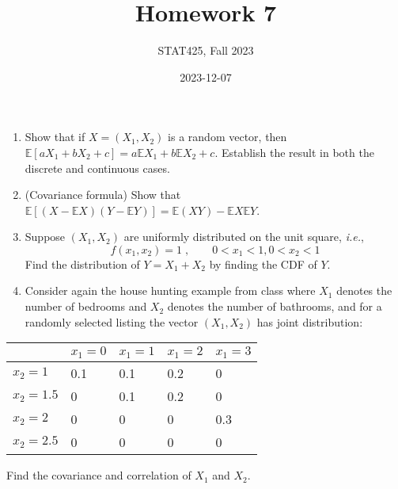 \documentclass[
  letterpaper,
  DIV=11,
  numbers=noendperiod]{scrartcl}
\title{Homework 7}
\author{STAT425, Fall 2023}
\date{2023-12-07}
\begin{document}
\maketitle
\pagestyle{fancy}  

\ifdefined\Shaded\renewenvironment{Shaded}{\begin{tcolorbox}[borderline west={3pt}{0pt}{shadecolor}, interior hidden, sharp corners, enhanced, boxrule=0pt, breakable, frame hidden]}{\end{tcolorbox}}\fi

\begin{enumerate}
\def\labelenumi{\arabic{enumi}.}
\item
  Show that if \(X = (X_1, X_2)\) is a random vector, then
  \(\mathbb{E}\left[aX_1 + bX_2 + c\right] = a\mathbb{E}X_1 + b\mathbb{E}X_2 + c\).
  Establish the result in both the discrete and continuous cases.
\item
  (Covariance formula) Show that
  \(\mathbb{E}\left[(X - \mathbb{E}X)(Y - \mathbb{E}Y)\right] = \mathbb{E}(XY) - \mathbb{E}X\mathbb{E}Y\).
\item
  Suppose \((X_1, X_2)\) are uniformly distributed on the unit square,
  \emph{i.e.}, \[f(x_1, x_2) = 1\;,\qquad 0 < x_1 < 1, 0 < x_2 < 1\]
  Find the distribution of \(Y = X_1 + X_2\) by finding the CDF of
  \(Y\).
\item
  Consider again the house hunting example from class where \(X_1\)
  denotes the number of bedrooms and \(X_2\) denotes the number of
  bathrooms, and for a randomly selected listing the vector
  \((X_1, X_2)\) has joint distribution:
\end{enumerate}

\begin{longtable}[]{@{}lllll@{}}
\toprule\noalign{}
& \(x_1 = 0\) & \(x_1 = 1\) & \(x_1 = 2\) & \(x_1 = 3\) \\
\midrule\noalign{}
\endhead
\bottomrule\noalign{}
\endlastfoot
\(x_2 = 1\) & 0.1 & 0.1 & 0.2 & 0 \\
\(x_2 = 1.5\) & 0 & 0.1 & 0.2 & 0 \\
\(x_2 = 2\) & 0 & 0 & 0 & 0.3 \\
\(x_2 = 2.5\) & 0 & 0 & 0 & 0 \\
\end{longtable}

Find the covariance and correlation of \(X_1\) and \(X_2\).
\end{document}
